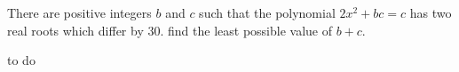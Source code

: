 There are positive integers $b$ and $c$ such that the polynomial ${2x^{2}+bc=c}$ has two real roots which differ by $30$. find the least possible value of $b+c$.

\begin{answer}
to do
\end{answer}
